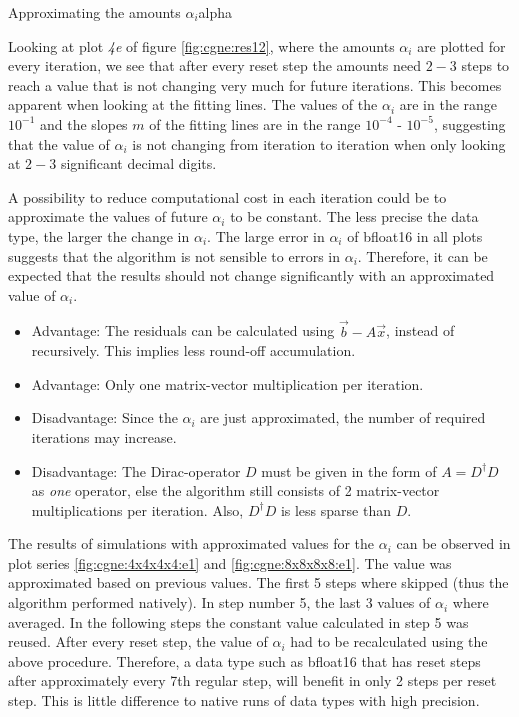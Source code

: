 \documentclass{article}
\theoremstyle{plain} %
\theoremstyle{convention} %
\theoremstyle{remark} %
\numberwithin{equation}{section}
\begin{document}
\begin{proposal}{Approximating the amounts $\alpha_i$}{alpha}

Looking at plot \textit{4e} of figure \ref{fig:cgne:res12}, where the amounts $\alpha_i$ are plotted for every iteration, we see that after every reset step the amounts need $2-3$ steps to reach a value that is not changing very much for future iterations. This becomes apparent when looking at the fitting lines. The values of the $\alpha_i$ are in the range $10^{-1}$ and the slopes $m$ of the fitting lines are in the range $10^{-4}$ - $10^{-5}$, suggesting that the value of $\alpha_i$ is not changing from iteration to iteration when only looking at $2-3$ significant decimal digits.

A possibility to reduce computational cost in each iteration could be to approximate the values of future $\alpha_i$ to be constant. The less precise the data type, the larger the change in $\alpha_i$. The large error in $\alpha_i$ of \gls{bfloat16} in all plots suggests that the algorithm is not sensible to errors in $\alpha_i$. Therefore, it can be expected that the results should not change significantly with an approximated value of $\alpha_i$.

\begin{itemize}
    \item Advantage: The residuals can be calculated using $\vec{b} - A \vec{x}$, instead of recursively. This implies less round-off accumulation.
    \item Advantage: Only one matrix-vector multiplication per iteration.
    \item Disadvantage: Since the $\alpha_i$ are just approximated, the number of required iterations may increase.
    \item Disadvantage: The Dirac-operator $D$ must be given in the form of $A = D^{\dagger} D$ as \textit{one} operator, else the algorithm still consists of \num{2} matrix-vector multiplications per iteration. Also, $D^{\dagger} D$ is less sparse than $D$.
\end{itemize}

The results of simulations with approximated values for the $\alpha_i$ can be observed in plot series \ref{fig:cgne:4x4x4x4:e1} and \ref{fig:cgne:8x8x8x8:e1}. The value was approximated based on previous values. The first \num{5} steps where skipped (thus the algorithm performed natively). In step number \num{5}, the last \num{3} values of $\alpha_i$ where averaged. In the following steps the constant value calculated in step \num{5} was reused. After every reset step, the value of $\alpha_i$ had to be recalculated using the above procedure. Therefore, a data type such as \gls{bfloat16} that has reset steps after approximately every \num{7}th regular step, will benefit in only \num{2} steps per reset step. This is little difference to native runs of data types with high precision.


\end{proposal}
\end{document}
